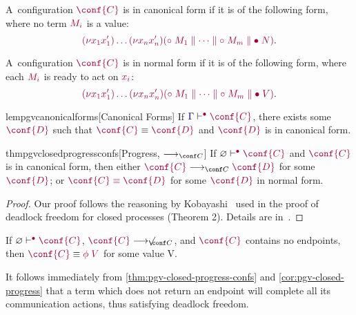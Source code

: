 \documentclass[main.tex]{subfiles}
\begin{document}
\begin{compacttheorems}
  \begin{definition}
    \label{def:pgv-canonical-forms}
    A~configuration $\tm{\conf{C}}$ is in canonical form if it is of the following form, where no term $\tm{M_i}$ is a value:
    \[
      \tm{\res{x_1}{x'_1}{\dots\res{x_n}{x'_n}{(\child\;M_1\parallel\dots\parallel\child\;M_m\parallel\main\;N)}}}.
    \]
  \end{definition}
  \begin{definition}
    A~configuration $\tm{\conf{C}}$ is in normal form if it is of the following form, where each $\tm{M_i}$ is ready to act on $\tm{x_i}$:
    \[
      \tm{\res{x_1}{x'_1}{\dots\res{x_n}{x'_n}{(\child\;M_1\parallel\dots\parallel\child\;M_m\parallel\main\;V)}}}.
    \]
  \end{definition}
  \begin{restatablelemma}{lempgvcanonicalforms}[Canonical Forms]
    \label{lem:pgv-canonical-forms}
    If $\cseq[\main]{\ty{\Gamma}}{\conf{C}}$, there exists some $\tm{\conf{D}}$ such that $\tm{\conf{C}}\equiv\tm{\conf{D}}$ and $\tm{\conf{D}}$ is in canonical form.
  \end{restatablelemma}
  \begin{restatabletheorem}{thmpgvclosedprogressconfs}[Progress, $\cred$]
    \label{thm:pgv-closed-progress-confs}
    If $\cseq[\main]{\emptyenv}{\conf{C}}$ and $\tm{\conf{C}}$ is in canonical form, then either $\tm{\conf{C}}\cred\tm{\conf{D}}$ for some $\tm{\conf{D}}$; or $\tm{\conf{C}\equiv\conf{D}}$ for some $\tm{\conf{D}}$ in normal form.
  \end{restatabletheorem}
  \begin{proof}
    Our proof follows the reasoning by Kobayashi~\cite{kobayashi06} used in the proof of deadlock freedom for closed processes (Theorem 2). Details are in~.
  \end{proof}
  \begin{corollary}
    \label{cor:pgv-closed-progress}
    If $\cseq[\main]{\emptyenv}{\conf{C}}$, $\tm{\conf{C}}\centernot\cred$, and $\tm{\conf{C}}$ contains no endpoints, then $\tm{\conf{C}}\equiv\tm{\phi\;V}$ for some value V.
  \end{corollary}
\end{compacttheorems}
It follows immediately from \cref{thm:pgv-closed-progress-confs} and \cref{cor:pgv-closed-progress} that a term which does not return an endpoint will complete all its communication actions, thus satisfying deadlock freedom.
\end{document}
